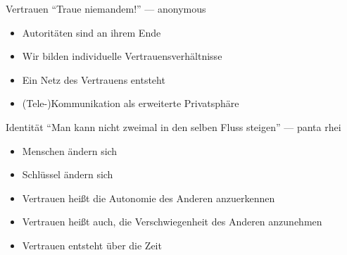\documentclass[aspectratio=1610]{beamer}
\begin{document}
  \begin{frame}{Vertrauen}
    “Traue niemandem!” --- anonymous
    \begin{itemize}
      \pause
      \item Autoritäten sind an ihrem Ende
      \pause
      \item Wir bilden individuelle Vertrauensverhältnisse
      \pause
      \item Ein Netz des Vertrauens entsteht
      \pause
      \item (Tele-)Kommunikation als erweiterte Privatsphäre
    \end{itemize}
  \end{frame}

  \begin{frame}{Identität}
    “Man kann nicht zweimal in den selben Fluss steigen” --- panta rhei
    \begin{itemize}
      \pause
      \item Menschen ändern sich
      \pause
      \item Schlüssel ändern sich
      \pause
      \item Vertrauen heißt die Autonomie des Anderen anzuerkennen
      \pause
      \item Vertrauen heißt auch, die Verschwiegenheit des Anderen anzunehmen
      \pause
      \item Vertrauen entsteht über die Zeit
    \end{itemize}
  \end{frame}
\end{document}
